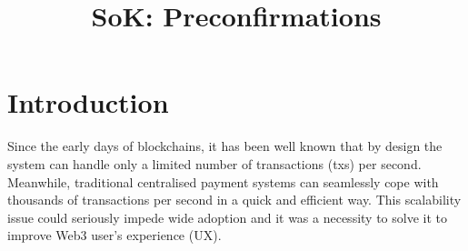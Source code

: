 \documentclass[a4paper]{article}
\theoremstyle{boldstyle}
\begin{document}
\title{SoK: Preconfirmations} 

\author{
\and
{}
\and
{}
}





\setlength{\marginparwidth}{2cm} 
\listoftodos

\section{Introduction}

Since the early days of blockchains, it has been well known that by design the system can handle only a limited number of transactions (txs) per second. Meanwhile, traditional centralised payment systems can seamlessly cope with thousands of transactions per second in a quick and efficient way. This scalability issue could seriously impede wide adoption and it was a necessity to solve it to improve Web3 user's experience (UX).
\end{document}
